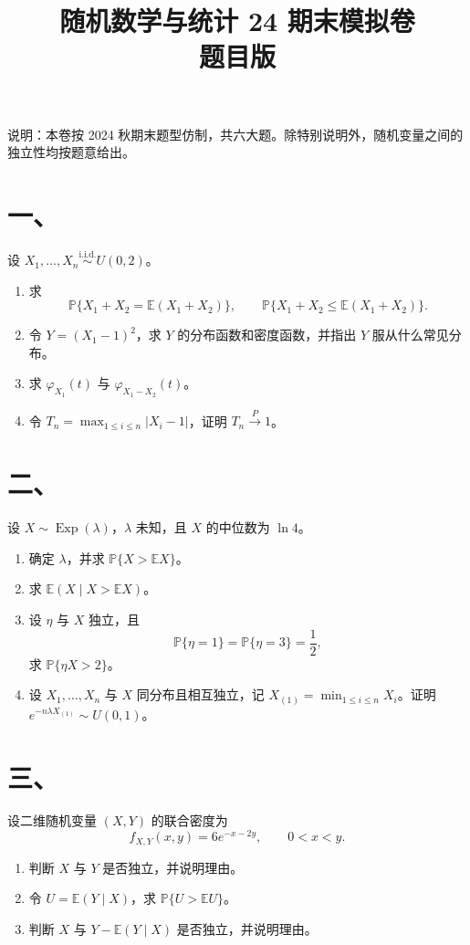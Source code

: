 \documentclass[UTF8,zihao=-4,fontset=windows]{ctexart}
\title{\vspace{-1.2cm}随机数学与统计 24 期末模拟卷\\题目版}
\date{}
\newcommand{\Prob}{\mathbb P}
\newcommand{\EX}{\mathbb E}
\newcommand{\iid}{\overset{\mathrm{i.i.d.}}{\sim}}
\begin{document}
\maketitle
\vspace{-1.5em}

说明：本卷按 2024 秋期末题型仿制，共六大题。除特别说明外，随机变量之间的独立性均按题意给出。

\section*{一、}
设 $X_1,\ldots,X_n \iid U(0,2)$。
\begin{enumerate}
  \item 求
  \[
    \Prob\{X_1+X_2=\EX(X_1+X_2)\},\qquad
    \Prob\{X_1+X_2\le \EX(X_1+X_2)\}.
  \]
  \item 令 $Y=(X_1-1)^2$，求 $Y$ 的分布函数和密度函数，并指出 $Y$ 服从什么常见分布。
  \item 求 $\varphi_{X_1}(t)$ 与 $\varphi_{X_1-X_2}(t)$。
  \item 令 $T_n=\max_{1\le i\le n}|X_i-1|$，证明 $T_n\xrightarrow{P}1$。
\end{enumerate}

\section*{二、}
设 $X\sim \operatorname{Exp}(\lambda)$，$\lambda$ 未知，且 $X$ 的中位数为 $\ln 4$。
\begin{enumerate}
  \item 确定 $\lambda$，并求 $\Prob\{X>\EX X\}$。
  \item 求 $\EX(X\mid X>\EX X)$。
  \item 设 $\eta$ 与 $X$ 独立，且
  \[
    \Prob\{\eta=1\}=\Prob\{\eta=3\}=\frac12,
  \]
  求 $\Prob\{\eta X>2\}$。
  \item 设 $X_1,\ldots,X_n$ 与 $X$ 同分布且相互独立，记
  $X_{(1)}=\min_{1\le i\le n}X_i$。证明 $e^{-n\lambda X_{(1)}}\sim U(0,1)$。
\end{enumerate}

\section*{三、}
设二维随机变量 $(X,Y)$ 的联合密度为
\[
  f_{X,Y}(x,y)=6e^{-x-2y},\qquad 0<x<y.
\]
\begin{enumerate}
  \item 判断 $X$ 与 $Y$ 是否独立，并说明理由。
  \item 令 $U=\EX(Y\mid X)$，求 $\Prob\{U>\EX U\}$。
  \item 判断 $X$ 与 $Y-\EX(Y\mid X)$ 是否独立，并说明理由。
\end{enumerate}
\end{document}

